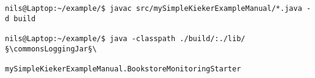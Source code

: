 \begin{lstlisting}
nils@Laptop:~/example/$ javac src/mySimpleKiekerExampleManual/*.java -d build

nils@Laptop:~/example/$ java -classpath ./build/:./lib/§\commonsLoggingJar§\
                        mySimpleKiekerExampleManual.BookstoreMonitoringStarter 
\end{lstlisting}

